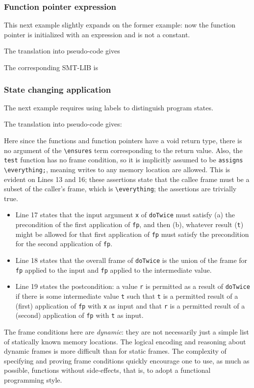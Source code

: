 \subsubsection{Function pointer expression}

This next example slightly expands on the former example: now the function pointer is initialized with an expression and is not a constant.


The translation into pseudo-code gives


The corresponding SMT-LIB is


\subsubsection{State changing application}
The next example requires using labels to distinguish program states.


The translation into pseudo-code gives:


Here since the functions and function pointers have a void return type, there is no argument of the \lstinline|\ensures| term corresponding to the return value. Also, the \lstinline|test| function has no frame condition,
so it is implicitly assumed to be \lstinline|assigns \everything;|, meaning writes to any memory location are allowed. This is evident on
Lines 13 and 16; these assertions state that the callee frame must be
a subset of the caller's frame, which is \lstinline|\everything|;
the assertions are trivially true.
\begin{itemize}
	\item Line 17 states that the input argument \lstinline|x| of \lstinline|doTwice|
	must satisfy (a) the precondition of the first application of
	\lstinline|fp|, and then (b), whatever result (\lstinline|t|) might be allowed
	for that first application of \lstinline|fp| must satisfy the
	precondition for the second application of \lstinline|fp|.
	\item Line 18 states that the overall frame of \lstinline|doTwice| is
	the union of the frame for \lstinline|fp| applied to the input and
	\lstinline|fp| applied to the intermediate value.
	\item Line 19 states the postcondition: a value \lstinline|r| is
	permitted as a result of \lstinline|doTwice| if there is some
	intermediate value \lstinline|t| such that \lstinline|t| is a permitted result of a (first) application of \lstinline|fp| with \lstinline|x| as input and that \lstinline|r| is a permitted result
	of a (second) application of \lstinline|fp| with \lstinline|t| as input.
\end{itemize}
The frame conditions here are \emph{dynamic}: they are not
necessarily just a simple list of statically known memory locations. The logical encoding and
reasoning about dynamic frames is more difficult than for static frames.
The complexity of specifying and proving frame conditions quickly encourage one to use, as much as possible, functions without side-effects,
that is, to adopt a functional programming style.


